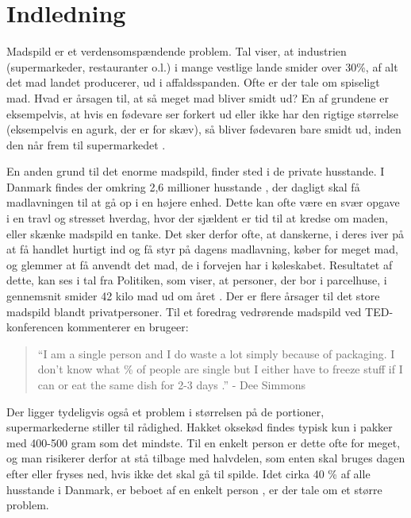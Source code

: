 \chapter{Indledning}
\label{sec:indledning}

Madspild er et verdensomspændende problem\cite{gustavssonSpild}. Tal viser, at industrien (supermarkeder, restauranter o.l.) i mange vestlige lande smider over 30\%, af alt det mad landet producerer, ud i affaldsspanden\cite{gustavssonSpild}. Ofte er der tale om spiseligt mad. Hvad er årsagen til, at så meget mad bliver smidt ud? En af grundene er eksempelvis, at hvis en fødevare ser forkert ud eller ikke har den rigtige størrelse (eksempelvis en agurk, der er for skæv), så bliver fødevaren bare smidt ud, inden den når frem til \fx supermarkedet \cite{tedmadspild}. 

En anden grund til det enorme madspild, finder sted i de private husstande. I Danmark findes der omkring 2,6 millioner husstande \cite{husstande}, der dagligt skal få madlavningen til at gå op i en højere enhed. Dette kan ofte være en svær opgave i en travl og stresset hverdag, hvor der sjældent er tid til at kredse om maden, eller skænke madspild en tanke. Det sker derfor ofte, at danskerne, i deres iver på at få handlet hurtigt ind og få styr på dagens madlavning, køber for meget mad, og glemmer at få anvendt det mad, de i forvejen har i køleskabet. Resultatet af dette, kan ses i tal fra Politiken, som viser, at personer, der bor i parcelhuse, i gennemsnit smider 42 kilo mad ud om året \cite{madspildpol}. Der er flere årsager til det store madspild blandt privatpersoner. Til et foredrag vedrørende madspild ved TED-konferencen kommenterer en brugeer: 

\begin{quote}
``I am a single person and I do waste a lot simply because of packaging. I don't know what \% of people are single but I either have to freeze stuff if I can or eat the same dish for 2-3 days \cite{tedcomment}.'' - Dee Simmons
\end{quote}
 
Der ligger tydeligvis også et problem i størrelsen på de portioner, supermarkederne stiller til rådighed. Hakket oksekød findes typisk kun i pakker med 400-500 gram som det mindste. Til en enkelt person er dette ofte for meget, og man risikerer derfor at stå tilbage med halvdelen, som enten skal bruges dagen efter eller fryses ned, hvis ikke det skal gå til spilde. Idet cirka 40 \% af alle husstande i Danmark, er beboet af en enkelt person \cite{madspild16}, er der tale om et større problem.

